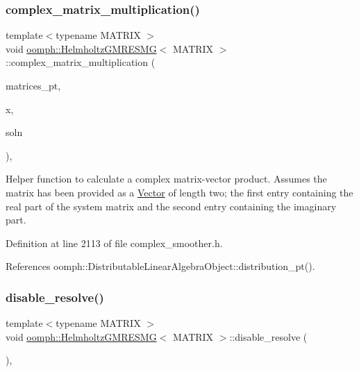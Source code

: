 \subsubsection{\texorpdfstring{complex\+\_\+matrix\+\_\+multiplication()}{complex\_matrix\_multiplication()}}
{\footnotesize\ttfamily template$<$typename M\+A\+T\+R\+IX $>$ \\
void \hyperlink{classoomph_1_1HelmholtzGMRESMG}{oomph\+::\+Helmholtz\+G\+M\+R\+E\+S\+MG}$<$ M\+A\+T\+R\+IX $>$\+::complex\+\_\+matrix\+\_\+multiplication (\begin{DoxyParamCaption}\item[{\hyperlink{classoomph_1_1Vector}{Vector}$<$ \hyperlink{classoomph_1_1CRDoubleMatrix}{C\+R\+Double\+Matrix} $\ast$$>$ const}]{matrices\+\_\+pt,  }\item[{const \hyperlink{classoomph_1_1Vector}{Vector}$<$ \hyperlink{classoomph_1_1DoubleVector}{Double\+Vector} $>$ \&}]{x,  }\item[{\hyperlink{classoomph_1_1Vector}{Vector}$<$ \hyperlink{classoomph_1_1DoubleVector}{Double\+Vector} $>$ \&}]{soln }\end{DoxyParamCaption})\hspace{0.3cm}{\ttfamily [inline]}, {\ttfamily [protected]}}



Helper function to calculate a complex matrix-\/vector product. Assumes the matrix has been provided as a \hyperlink{classoomph_1_1Vector}{Vector} of length two; the first entry containing the real part of the system matrix and the second entry containing the imaginary part. 



Definition at line 2113 of file complex\+\_\+smoother.\+h.



References oomph\+::\+Distributable\+Linear\+Algebra\+Object\+::distribution\+\_\+pt().

\mbox{\label{classoomph_1_1HelmholtzGMRESMG_a842b638722cd45650da8771aea2f9e5c}} 
\subsubsection{\texorpdfstring{disable\+\_\+resolve()}{disable\_resolve()}}
{\footnotesize\ttfamily template$<$typename M\+A\+T\+R\+IX $>$ \\
void \hyperlink{classoomph_1_1HelmholtzGMRESMG}{oomph\+::\+Helmholtz\+G\+M\+R\+E\+S\+MG}$<$ M\+A\+T\+R\+IX $>$\+::disable\+\_\+resolve (\begin{DoxyParamCaption}{ }\end{DoxyParamCaption})\hspace{0.3cm}{\ttfamily [inline]}, {\ttfamily [virtual]}}



